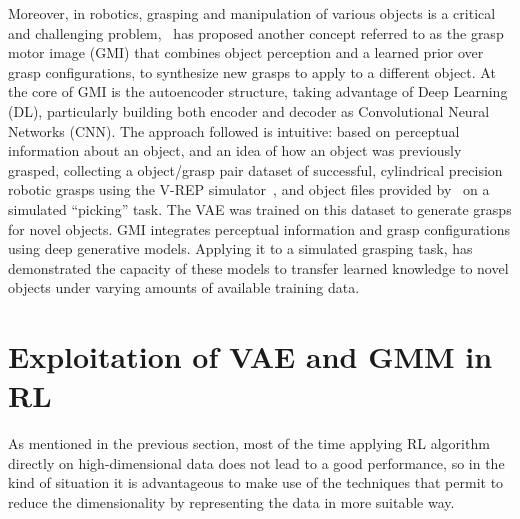 Moreover, in robotics, grasping and manipulation of various objects is a critical and challenging problem,~\cite{veres2017modeling} has proposed another concept referred to as the grasp motor image (GMI) that combines object perception and a learned prior over grasp configurations, to synthesize new grasps to apply to a different object. At the core of GMI is the autoencoder structure, taking advantage of Deep  Learning (DL), particularly building both encoder and decoder as Convolutional Neural Networks (CNN). The approach followed is intuitive: based on
perceptual information about an object, and an idea of how an object was previously grasped, collecting a object/grasp pair dataset of successful, cylindrical precision robotic grasps using the V-REP  simulator~\cite{rohmer2013v}, and object files provided by~\cite{kleinhans2015g3db} on a simulated “picking” task. The VAE was trained on this dataset to generate grasps for novel objects. GMI integrates
perceptual information and grasp configurations using deep generative models. Applying it to a simulated grasping task, has demonstrated the capacity of these models to transfer learned knowledge to novel objects under varying amounts of available training data.\\


\section{Exploitation of VAE and GMM in RL}
As mentioned in the previous section, most of the time applying RL algorithm directly on high-dimensional data does not lead to a good performance, so in the kind of situation it is advantageous to make use of the techniques that permit to reduce the dimensionality by representing the data in more suitable way.\\

